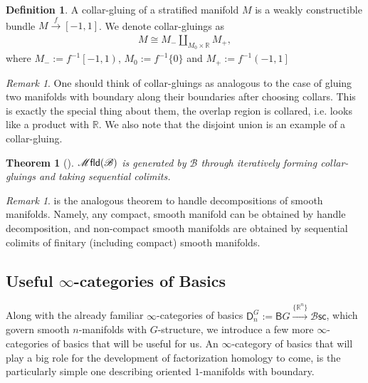 \documentclass[12pt,a4paper]{article}
\newcounter{counter} \numberwithin{counter}{section}
\theoremstyle{definition}
\newtheorem{definition}[counter]{Definition}
\theoremstyle{plain}
\newtheorem{theorem}[counter]{Theorem}
\theoremstyle{remark}
\newtheorem{remark}[counter]{Remark}
\newcommand{\mfld}[1][s]{%
    \ifx r#1\mathsf{Mfld}\else
    \ifx s#1\mathscr{M} \mathsf{fld}\else
    \mathrm{Illegal~option}%
    \fi\fi
}
\newcommand{\bsc}{\mathscr{B} \mathsf{sc}}
\newcommand{\bstr}{\mathscr{B}}
\begin{document}
\begin{definition}\label{def:collar-gluing}
    A collar-gluing of a stratified manifold $M$ is a weakly constructible bundle $M \xrightarrow{f} [-1,1]$. We denote collar-gluings as
    \begin{align}
        M \cong M_- \coprod_{M_0 \times \mathbb{R}} M_+,
    \end{align}
    where $M_- := f^{-1}\left[ -1, 1 \right)$, $M_0 := f^{-1}\{0\}$ and $M_+ := f^{-1} \left( -1, 1 \right]$
\end{definition}

\begin{remark}
    One should think of collar-gluings as analogous to the case of gluing two manifolds with boundary along their boundaries after choosing collars. This is exactly the special thing about them, the overlap region is collared, i.e. looks like a product with $\mathbb{R}$. We also note that the disjoint union is an example of a collar-gluing.
\end{remark}

\begin{theorem}[\cite{aft_localstrut}]\label{thm:decom_strat_man}
    $\mfld(\bstr)$ is generated by $\bstr$ through iteratively forming collar-gluings and taking sequential colimits.
\end{theorem}

\begin{remark}
     is the analogous theorem to handle decompositions of smooth manifolds. Namely, any compact, smooth manifold can be obtained by handle decomposition, and non-compact smooth manifolds are obtained by sequential colimits of finitary (including compact) smooth manifolds.
\end{remark}




\subsection{Useful \texorpdfstring{$\infty$}{infinite}-categories of Basics}

Along with the already familiar $\infty$-categories of basics $\mathsf{D}_n^{G} := \mathsf{B}G \xrightarrow{\{ \mathbb{R}^n\}} \bsc$, which govern smooth $n$-manifolds with $G$-structure, we introduce a few more $\infty$-categories of basics that will be useful for us. An $\infty$-category of basics that will play a big role for the development of factorization homology to come, is the particularly simple one describing oriented $1$-manifolds with boundary.
\end{document}
